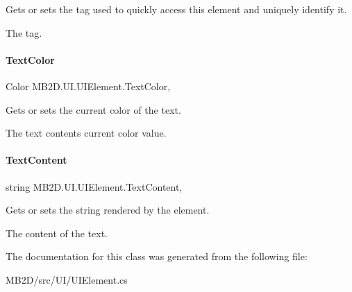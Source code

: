 Gets or sets the tag used to quickly access this element and uniquely identify it. 

The tag.\hypertarget{class_m_b2_d_1_1_u_i_1_1_u_i_element_aaf5bdcd4524ae5e93f1c40431d7d6c90}{}\label{class_m_b2_d_1_1_u_i_1_1_u_i_element_aaf5bdcd4524ae5e93f1c40431d7d6c90} 
\paragraph{\texorpdfstring{Text\+Color}{TextColor}}
{\footnotesize\ttfamily Color M\+B2\+D.\+U\+I.\+U\+I\+Element.\+Text\+Color\hspace{0.3cm}{\ttfamily [get]}, {\ttfamily [set]}}



Gets or sets the current color of the text. 

The text contents current color value.\hypertarget{class_m_b2_d_1_1_u_i_1_1_u_i_element_abddab0c939c89a0be403b577d4428309}{}\label{class_m_b2_d_1_1_u_i_1_1_u_i_element_abddab0c939c89a0be403b577d4428309} 
\paragraph{\texorpdfstring{Text\+Content}{TextContent}}
{\footnotesize\ttfamily string M\+B2\+D.\+U\+I.\+U\+I\+Element.\+Text\+Content\hspace{0.3cm}{\ttfamily [get]}, {\ttfamily [set]}}



Gets or sets the string rendered by the element. 

The content of the text.

The documentation for this class was generated from the following file\+:\begin{DoxyCompactItemize}
\item 
M\+B2\+D/src/\+U\+I/U\+I\+Element.\+cs\end{DoxyCompactItemize}
